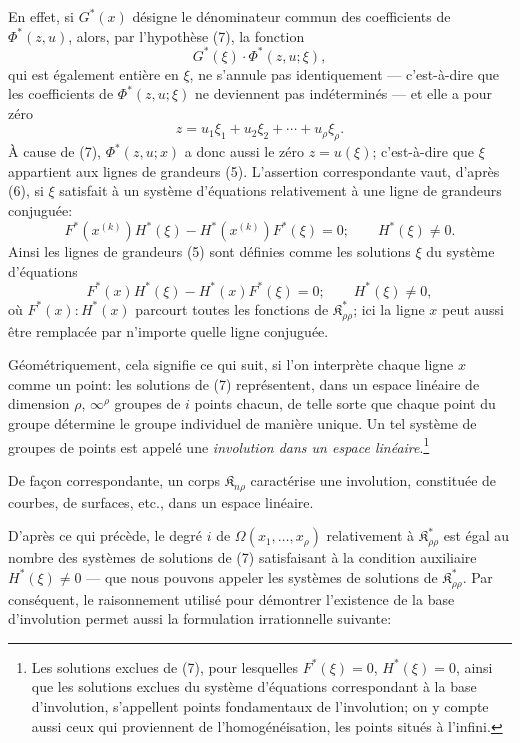 \documentclass[11pt]{article}
\providecommand{\Kfield}{\mathfrak{K}}
\begin{document}
En effet, si $G^*(x)$ désigne le dénominateur commun des coefficients de $\Phi^*(z,u)$, alors, par l'hypothèse (7), la fonction
\[
  G^*(\xi)\cdot\Phi^*(z,u;\xi),
\]
qui est également entière en $\xi$, ne s'annule pas identiquement --- c'est-à-dire que les coefficients de $\Phi^*(z,u;\xi)$ ne deviennent pas indéterminés --- et elle a pour zéro
\[
  z=u_1\xi_1+u_2\xi_2+\cdots+u_\rho\xi_\rho.
\]
À cause de (7), $\Phi^*(z,u;x)$ a donc aussi le zéro $z=u(\xi)$; c'est-à-dire que $\xi$ appartient aux lignes de grandeurs (5). L'assertion correspondante vaut, d'après (6), si $\xi$ satisfait à un système d'équations relativement à une ligne de grandeurs conjuguée:
\[
  F^*(x^{(k)})H^*(\xi)-H^*(x^{(k)})F^*(\xi)=0;
  \qquad H^*(\xi)\ne0.
\]
Ainsi les lignes de grandeurs (5) sont définies comme les solutions $\xi$ du système d'équations
\[
  F^*(x)H^*(\xi)-H^*(x)F^*(\xi)=0;
  \qquad H^*(\xi)\ne0,
\]
où $F^*(x):H^*(x)$ parcourt toutes les fonctions de $\Kfield^*_{\rho\rho}$; ici la ligne $x$ peut aussi être remplacée par n'importe quelle ligne conjuguée.

Géométriquement, cela signifie ce qui suit, si l'on interprète chaque ligne $x$ comme un point: les solutions de (7) représentent, dans un espace linéaire de dimension $\rho$, $\infty^\rho$ groupes de $i$ points chacun, de telle sorte que chaque point du groupe détermine le groupe individuel de manière unique. Un tel système de groupes de points est appelé une \og{}\emph{involution dans un espace linéaire}\fg{}.\footnote{Les solutions exclues de (7), pour lesquelles $F^*(\xi)=0$, $H^*(\xi)=0$, ainsi que les solutions exclues du système d'équations correspondant à la base d'involution, s'appellent points fondamentaux de l'involution; on y compte aussi ceux qui proviennent de l'homogénéisation, les points \og{}situés à l'infini\fg{}.}

De façon correspondante, un corps $\Kfield_{n\rho}$ caractérise une involution, constituée de courbes, de surfaces, etc., dans un espace linéaire.

D'après ce qui précède, le degré $i$ de $\Omega(x_1,\ldots,x_\rho)$ relativement à $\Kfield^*_{\rho\rho}$ est égal au nombre des systèmes de solutions de (7) satisfaisant à la condition auxiliaire $H^*(\xi)\ne0$ --- que nous pouvons appeler les systèmes de solutions de $\Kfield^*_{\rho\rho}$. Par conséquent, le raisonnement utilisé pour démontrer l'existence de la base d'involution permet aussi la formulation irrationnelle suivante:
\end{document}

